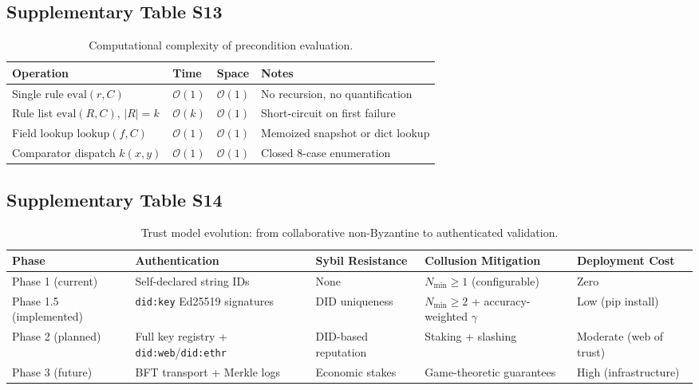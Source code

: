 \subsection{Supplementary Table S13}\label{tab:S13}
\begin{table}[htbp]
\centering
\small
\caption{Computational complexity of precondition evaluation.}
\label{tab:complexity}
\begin{tabularx}{\textwidth}{@{}p{5cm}llX@{}}
\toprule
\textbf{Operation} & \textbf{Time} & \textbf{Space} & \textbf{Notes} \\
\midrule
Single rule $\text{eval}(r, C)$ & $\mathcal{O}(1)$ & $\mathcal{O}(1)$ & No recursion, no quantification \\
Rule list $\text{eval}(R, C)$, $|R| = k$ & $\mathcal{O}(k)$ & $\mathcal{O}(1)$ & Short-circuit on first failure \\
Field lookup $\text{lookup}(f, C)$ & $\mathcal{O}(1)$ & $\mathcal{O}(1)$ & Memoized snapshot or dict lookup \\
Comparator dispatch $k(x, y)$ & $\mathcal{O}(1)$ & $\mathcal{O}(1)$ & Closed 8-case enumeration \\
\bottomrule
\end{tabularx}
\end{table}

\subsection{Supplementary Table S14}\label{tab:S14}
\begin{table}[htbp]
\centering
\caption{Trust model evolution: from collaborative non-Byzantine to authenticated validation.}
\label{tab:trust-evolution}
\begin{tabular}{@{}lp{2.8cm}p{2.5cm}p{3cm}p{2.2cm}@{}}
\toprule
\textbf{Phase} & \textbf{Authentication} & \textbf{Sybil Resistance} & \textbf{Collusion Mitigation} & \textbf{Deployment Cost} \\
\midrule
Phase 1 (current) & Self-declared string IDs & None & $N_{\min} \geq 1$ (configurable) & Zero \\
Phase 1.5 (implemented) & \texttt{did:key} Ed25519 signatures & DID uniqueness & $N_{\min} \geq 2$ + accuracy-weighted $\gamma$ & Low (pip install) \\
Phase 2 (planned) & Full key registry + \texttt{did:web}/\texttt{did:ethr} & DID-based reputation & Staking + slashing & Moderate (web of trust) \\
Phase 3 (future) & BFT transport + Merkle logs & Economic stakes & Game-theoretic guarantees & High (infrastructure) \\
\bottomrule
\end{tabular}
\end{table}

